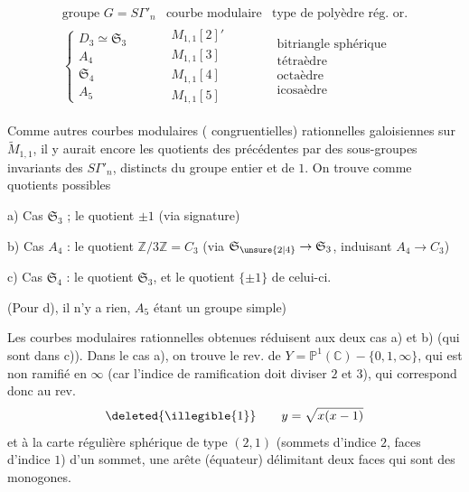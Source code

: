\[
\begin{array}{lll}
\text{groupe }G=S\Gamma'_n & \text{courbe modulaire} & \text{type de polyèdre rég. or.}\\[.5em]
\left\{\begin{array}{l}D_3\simeq\mathfrak S_3\\ A_4\\ \mathfrak S_4\\ A_5\end{array}\right.
&\begin{array}{l}M_{1,1}[2]'\\M_{1,1}[3]\\M_{1,1}[4]\\M_{1,1}[5]\end{array}
&\begin{array}{l}\text{bitriangle sphérique}\\\text{tétraèdre}\\\text{octaèdre}\\\text{icosaèdre}\end{array}
\end{array}
\tag{75}
\]

Comme autres courbes modulaires ( congruentielles)
rationnelles galoisiennes sur $\widetilde M_{1,1}$, il y aurait encore
les quotients des précédentes par des sous-groupes
invariants des $S\Gamma'_n$, distincts du groupe entier et de $1$.
On trouve comme quotients possibles

\noindent a) Cas $\mathfrak S_3$ ; le quotient $\pm1$ (via signature)

\noindent b) Cas $A_4$ : le quotient $\mathbb Z/3\mathbb Z=C_3$
(via $\mathfrak S_{\unsure{2|4}}\to\mathfrak S_3$, induisant $A_4\to C_3$)

\noindent c) Cas $\mathfrak S_4$ : le quotient $\mathfrak S_3$, et le quotient $\{\pm1\}$ de celui-ci.

(Pour d), il n'y a rien, $A_5$ étant un groupe simple)


Les courbes modulaires rationnelles obtenues 
réduisent aux deux cas a) et b) (qui sont
 dans c)). Dans le cas a), on trouve
le rev.  de $Y=\mathbb P^1(\mathbb C)-\{0,1,\infty\}$, qui est non
ramifié en $\infty$ (car l'indice de ramification doit
diviser $2$ et $3$), qui correspond donc au rev.
\[
\deleted{\illegible{1}}\qquad y=\sqrt{x(x-1)}
\]
et à la carte régulière sphérique de type $(2,1)$
(sommets d'indice $2$, faces d'indice $1$)
 d'un sommet,  une arête (équateur) délimitant deux faces qui sont des monogones.

